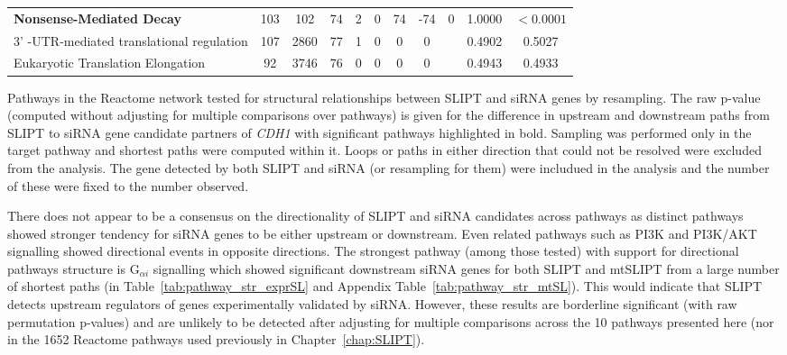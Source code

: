 \begin{table*}[!htb]
{{\begin{threeparttable}
\begin{tabular}{l|cc|cc|cccc|cc}
\rowcolor{black!5}
\textbf{Nonsense-Mediated Decay}                   & 103         & 102          & 74            & 2           & 0    & 74   & -74     & 0            & 1.0000             & $<0.0001$                   \\
\rowcolor{black!10}
3' -UTR-mediated translational regulation & 107         & 2860         & 77            & 1           & 0    & 0    & 0       &              & 0.4902             & 0.5027              \\
\rowcolor{black!5}
Eukaryotic Translation Elongation         & 92          & 3746         & 76            & 0           & 0    & 0    & 0       &              & 0.4943             & 0.4933              \\
\hline
\end{tabular}
\begin{tablenotes}
\raggedright \small
Pathways in the Reactome network tested for structural relationships between \gls{SLIPT} and \gls{siRNA} genes by resampling. The raw p-value (computed without adjusting for multiple comparisons over pathways) is given for the difference in upstream and downstream paths from \gls{SLIPT} to \gls{siRNA} gene candidate partners of \textit{CDH1} with significant pathways highlighted in bold. Sampling was performed only in the target pathway and \glspl{shortest path} were computed within it. Loops or paths in either direction that could not be resolved were excluded from the analysis. The gene detected by both \gls{SLIPT} and \gls{siRNA} (or resampling for them) were includued in the analysis and the number of these were fixed to the number observed.
\end{tablenotes}
\end{threeparttable}
}
}
\end{table*}

There does not appear to be a consensus on the directionality of \gls{SLIPT} and \gls{siRNA} candidates across pathways as distinct pathways showed stronger tendency for \gls{siRNA} genes to be either upstream or downstream. Even related pathways such as \gls{PI3K} and PI3K/AKT signalling showed directional events in opposite directions. The strongest pathway (among those tested) with support for directional pathways structure is G$_{\alpha i}$ signalling which showed significant downstream \gls{siRNA} genes for both SLIPT and \acrshort{mtSLIPT} from a large number of \glspl{shortest path} (in Table~\ref{tab:pathway_str_exprSL} and Appendix Table~\ref{tab:pathway_str_mtSL}). This would indicate that \gls{SLIPT} detects upstream regulators of genes experimentally validated by \gls{siRNA}. However, these results are borderline significant (with raw permutation p-values) and are unlikely to be detected after adjusting for multiple comparisons across the 10 pathways presented here (nor in the 1652 Reactome pathways used previously in Chapter~\ref{chap:SLIPT}).

